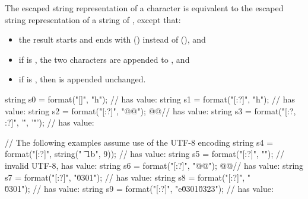 \pnum
The escaped string representation of a character 
is equivalent to the escaped string representation
of a string of , except that:

\begin{itemize}
\item
the result starts and ends with  ()
instead of  (), and
\item
if  is ,
the two characters  are appended to , and
\item
if  is ,
then  is appended unchanged.
\end{itemize}

\begin{example}
\begin{codeblock}
string s0 = format("[{}]", "h\tllo");                   //  has value: \tcode{[h\ \ \ \ llo]}
string s1 = format("[{:?}]", "h\tllo");                 //  has value: 
string s2 = format("[{:?}]", "@@");  @\kern1.25pt@//  has value: 
string s3 = format("[{:?}, {:?}]", '\'', '"');          //  has value: \tcode{['\textbackslash '', '"']}

// The following examples assume use of the UTF-8 encoding
string s4 = format("[{:?}]", string("\0 \n \t {} \x1b", 9));
                                                    //  has value: 
string s5 = format("[{:?}]", "");           // invalid UTF-8,  has value: \tcode{["\textbackslash x\{c3\}("]}
string s6 = format("[{:?}]", "@@");                 @\kern0.75pt@//  has value: 
string s7 = format("[{:?}]", "\u0301");             //  has value: \tcode{["\textbackslash u\{301\}"]}
string s8 = format("[{:?}]", "\\\u0301");           //  has value: 
string s9 = format("[{:?}]", "e\u0301\u0323");      //  has value: 
\end{codeblock}
\end{example}

